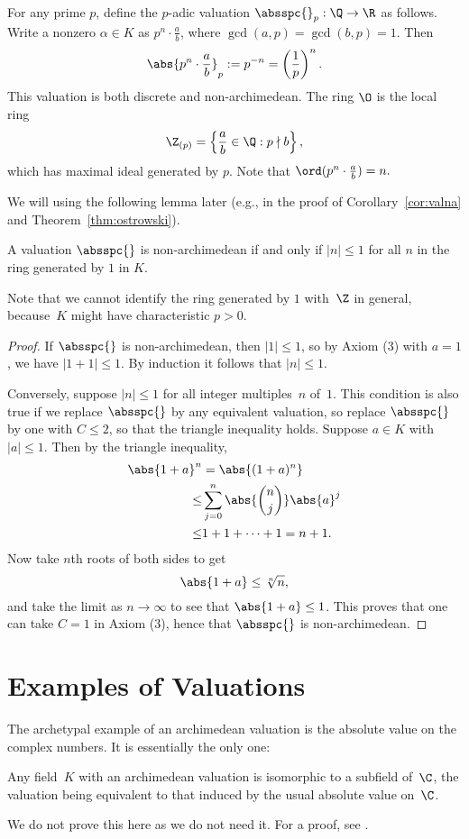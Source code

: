 \begin{example}\label{ex:padic_valuation}
For any prime $p$, define the $p$-adic valuation
$\absspc{}_p:\Q\to\R$ as follows.  Write a nonzero $\alpha\in K$
as $p^n\cdot \frac{a}{b}$, where $\gcd(a,p)=\gcd(b,p)=1$.  Then
$$\abs{p^n\cdot \frac{a}{b}}_p := p^{-n} = \left(\frac{1}{p}\right)^{n}.$$
This valuation is both discrete and non-archimedean.
The ring $\O$ is the local ring
$$
  \Z_{(p)} = \left\{\frac{a}{b}\in\Q : p\nmid b\right\},
$$
which has maximal ideal generated by $p$.  Note that
$\ord(p^n\cdot \frac{a}{b}) = n.$
\end{example}

We will using the following lemma later (e.g., in
the proof of Corollary~\ref{cor:valna} and Theorem~\ref{thm:ostrowski}).
\begin{lemma}\label{lem:nonarch}
  A valuation $\absspc{}$ is non-archimedean if and only if $|n|\leq
  1$ for all $n$ in the ring generated by $1$ in $K$.
\end{lemma}
Note that we cannot identify the ring generated by $1$ with~$\Z$ 
in general, because~$K$ might have characteristic $p>0$.
\begin{proof}
If $\absspc{}$ is non-archimedean, then $|1|\leq 1$,
so by Axiom (3) with $a=1$, we have  $|1+1|\leq 1$.  By
induction it follows that $|n|\leq 1$.

Conversely, suppose $|n|\leq 1$ for all integer multiples~$n$ of~$1$.
This condition is also true if we replace $\absspc{}$ by
any equivalent valuation, so replace $\absspc{}$ by
one with $C\leq 2$, so that the triangle inequality holds.
Suppose $a\in K$ with $|a|\leq 1$.  Then 
by the triangle inequality,
\begin{align*}
  \abs{1+a}^n &= \abs{(1+a)^n} \\
     \leq& \sum_{j=0}^n \abs{\binom{n}{j}} \abs{a}^j\\
     \leq& 1 + 1 + \cdots + 1 = n+1.
\end{align*}
Now take $n$th roots of both sides to get
$$\abs{1+a} \leq \sqrt[n]{n},$$
and take the limit as $n\to \infty$ to see
that $\abs{1+a} \leq 1$.  This proves that one
can take $C=1$ in Axiom (3), hence that $\absspc{}$
is non-archimedean.
\end{proof}

\section{Examples of Valuations}
The archetypal example of an archimedean valuation is the absolute
value on the complex numbers.  It is essentially the only one:
\begin{theorem} Any field~$K$ with
an archimedean valuation is isomorphic to a subfield of~$\C$,
the valuation being equivalent to that induced by the usual
absolute value on~$\C$.
\end{theorem}
We do not prove this here as we do not need it.  For a proof,
see \cite[pg. 45, 67]{artin:ant}.


